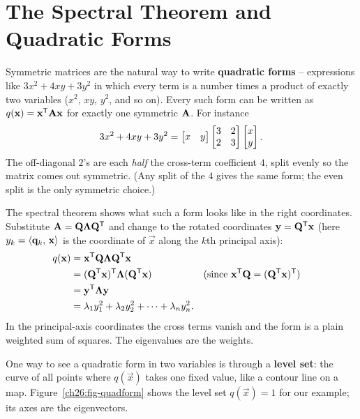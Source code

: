 \section{The Spectral Theorem and Quadratic Forms}
\label{ch26:quadratic-forms}

Symmetric matrices are the natural way to write \textbf{quadratic forms} --
expressions like $3x^2 + 4xy + 3y^2$ in which every term is a number times a
product of exactly two variables ($x^2$, $xy$, $y^2$, and so on). Every
such form can be written as $q(\mathbf{x}) = \mathbf{x}^{\mathsf{T}}\mathbf{A}\mathbf{x}$ for exactly one
symmetric $\mathbf{A}$. For instance
\[
  3x^2 + 4xy + 3y^2
  = \begin{bmatrix}x&y\end{bmatrix}\begin{bmatrix}3&2\\2&3\end{bmatrix}\begin{bmatrix}x\\y\end{bmatrix}.
\]
The off-diagonal $2$'s are each \emph{half} the cross-term coefficient $4$, split
evenly so the matrix comes out symmetric. (Any split of the $4$ gives the same
form; the even split is the only symmetric choice.)

The spectral theorem shows what such a form looks like in the right coordinates.
Substitute $\mathbf{A}=\mathbf{Q}\mathbf{\Lambda}\mathbf{Q}^{\mathsf{T}}$ and change to the rotated
coordinates $\mathbf{y}=\mathbf{Q}^{\mathsf{T}}\mathbf{x}$ (here $y_k = \langle \mathbf{q}_k,\, \mathbf{x} \rangle$ is
the coordinate of $\vec{x}$ along the $k$th principal axis):
\begin{align*}
  q(\mathbf{x}) &= \mathbf{x}^{\mathsf{T}}\mathbf{Q}\mathbf{\Lambda}\mathbf{Q}^{\mathsf{T}}\mathbf{x}\\
  &= (\mathbf{Q}^{\mathsf{T}}\mathbf{x})^{\mathsf{T}}\mathbf{\Lambda}(\mathbf{Q}^{\mathsf{T}}\mathbf{x}) && \text{(since } \mathbf{x}^{\mathsf{T}}\mathbf{Q} = (\mathbf{Q}^{\mathsf{T}}\mathbf{x})^{\mathsf{T}})\\
  &= \mathbf{y}^{\mathsf{T}}\mathbf{\Lambda}\mathbf{y}\\
  &= \lambda_1 y_1^2 + \lambda_2 y_2^2 + \cdots + \lambda_n y_n^2.
\end{align*}
In the principal-axis coordinates the cross terms vanish
and the form is a plain weighted sum of squares. The eigenvalues are the weights.

One way to see a quadratic form in two variables is through a \textbf{level
set}: the curve of all points where $q(\vec{x})$ takes one fixed value, like a
contour line on a map. Figure~\ref{ch26:fig-quadform} shows the level set
$q(\vec{x})=1$ for our example; its axes are the eigenvectors.

